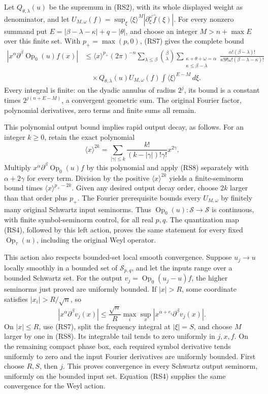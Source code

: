\documentclass[
  11pt,
]{article}
\begin{document}
Let \(Q_{\theta,\lambda}(u)\) be the supremum in (RS2), with its whole
displayed weight as denominator, and let
\(U_{M,\omega}(f)=\sup_\xi\langle\xi\rangle^M
|\partial_\xi^\omega\widehat f(\xi)|\). For every nonzero summand put
\(E=|\beta-\lambda-\kappa|+q-|\theta|\), and choose an integer
\(M>n+\max E\) over this finite set. With \(p_+=\max(p,0)\), (RS7) gives
the complete bound \[
 \begin{split}
 |x^\alpha\partial^\beta\operatorname{Op}_0(u)f(x)|
 &\leq\langle x\rangle^{p_+}(2\pi)^{-n}
 \sum_{\lambda\leq\beta}\binom{\beta}{\lambda}
 \sum_{\substack{\kappa+\theta+\omega=\alpha\\
                 \kappa\leq\beta-\lambda}}
 \frac{\alpha!(\beta-\lambda)!}
      {\kappa!\theta!\omega!(\beta-\lambda-\kappa)!}\\
 &\quad\times Q_{\theta,\lambda}(u)U_{M,\omega}(f)
                   \int\langle\xi\rangle^{E-M}\,d\xi .
 \end{split}
 \tag{RS8}
\] Every integral is finite: on the dyadic annulus of radius \(2^j\),
its bound is a constant times \(2^{j(n+E-M)}\), a convergent geometric
sum. The original Fourier factor, polynomial derivatives, zero terms and
finite sums all remain.

This polynomial output bound implies rapid output decay, as follows. For
an integer \(k\geq0\), retain the exact polynomial \[
 \langle x\rangle^{2k}
   =\sum_{|\gamma|\leq k}
          \frac{k!}{(k-|\gamma|)!\gamma!}x^{2\gamma}.
 \tag{RS9}
\] Multiply \(x^\alpha\partial^\beta\operatorname{Op}_0(u)f\) by this
polynomial and apply (RS8) separately with \(\alpha+2\gamma\) for every
term. Division by the positive \(\langle x\rangle^{2k}\) yields a
finite-seminorm bound times \(\langle x\rangle^{p_+-2k}\). Given any
desired output decay order, choose \(2k\) larger than that order plus
\(p_+\). The Fourier prerequisite bounds every \(U_{M,\omega}\) by
finitely many original Schwartz input seminorms. Thus
\(\operatorname{Op}_0(u):\mathcal S\to\mathcal S\) is continuous, with
finite symbol-seminorm control, for all real \(p,q\). The quantization
map (RS4), followed by this left action, proves the same statement for
every fixed \(\operatorname{Op}_\tau(u)\), including the original Weyl
operator.

This action also respects bounded-set local smooth convergence. Suppose
\(u_j\to u\) locally smoothly in a bounded set of \(\mathcal S_{p,q}\),
and let the inputs range over a bounded Schwartz set. For the output
\(v_j=\operatorname{Op}_0(u_j-u)f\), the higher seminorms just proved
are uniformly bounded. If \(|x|>R\), some coordinate satisfies
\(|x_i|>R/\sqrt n\), so \[
 |x^\alpha\partial^\beta v_j(x)|
 \leq\frac{\sqrt n}{R}
             \max_i\sup_x|x^{\alpha+e_i}\partial^\beta v_j(x)|.
 \tag{RS10}
\] On \(|x|\leq R\), use (RS7), split the frequency integral at
\(|\xi|=S\), and choose \(M\) larger by one in (RS8). Its integrable
tail tends to zero uniformly in \(j,x,f\). On the remaining compact
phase box, each required symbol derivative tends uniformly to zero and
the input Fourier derivatives are uniformly bounded. First choose
\(R,S\), then \(j\). This proves convergence in every Schwartz output
seminorm, uniformly on the bounded input set. Equation (RS4) supplies
the same convergence for the Weyl action.
\end{document}
